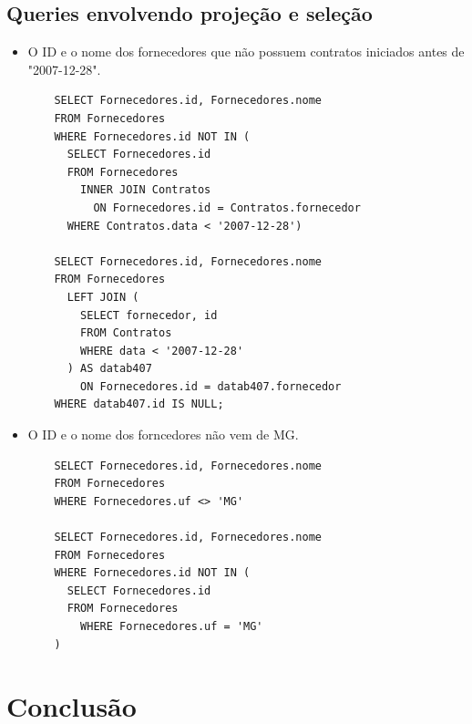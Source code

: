 \documentclass{article}
\begin{document}
\subsection{Queries envolvendo projeção e seleção}
\begin{itemize}
\item O ID e o nome dos fornecedores que não possuem contratos iniciados antes de "2007-12-28".
  \begin{verbatim}
    SELECT Fornecedores.id, Fornecedores.nome
    FROM Fornecedores
    WHERE Fornecedores.id NOT IN (
      SELECT Fornecedores.id
      FROM Fornecedores
        INNER JOIN Contratos
          ON Fornecedores.id = Contratos.fornecedor
      WHERE Contratos.data < '2007-12-28')
      
    SELECT Fornecedores.id, Fornecedores.nome
    FROM Fornecedores
      LEFT JOIN (
        SELECT fornecedor, id
        FROM Contratos
        WHERE data < '2007-12-28'
      ) AS datab407
        ON Fornecedores.id = datab407.fornecedor 
    WHERE datab407.id IS NULL;
    \end{verbatim}
\item O ID e o nome dos forncedores não vem de MG.
  \begin{verbatim}
    SELECT Fornecedores.id, Fornecedores.nome
    FROM Fornecedores
    WHERE Fornecedores.uf <> 'MG'

    SELECT Fornecedores.id, Fornecedores.nome
    FROM Fornecedores
    WHERE Fornecedores.id NOT IN (
      SELECT Fornecedores.id
      FROM Fornecedores
	    WHERE Fornecedores.uf = 'MG'
    )

    \end{verbatim}
\end{itemize}
\pagebreak
\section{Conclusão}



\end{document}
